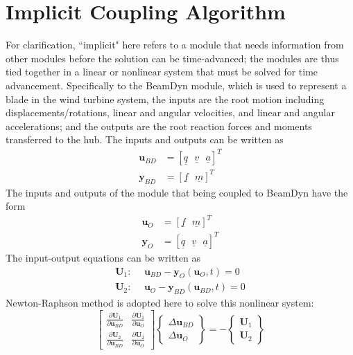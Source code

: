 \documentclass{aiaa-tc}
\renewcommand{\vec}[1]{\underline{#1}}
\begin{document}
\section{Implicit Coupling Algorithm}
For clarification, ``implicit" here refers to a module that needs information from other modules before the solution can be time-advanced; the modules are thus tied together in a linear or nonlinear system that must be solved for time advancement. Specifically to the BeamDyn module, which is used to represent a blade in the wind turbine system, the inputs are the root motion including displacements/rotations, linear and angular velocities, and linear and angular accelerations; and the outputs are the root reaction forces and moments transferred to the hub. The inputs and outputs can be written as
\begin{align}
    \label{BDInput}
    \mathbf{u}_{BD} &= \left[ \vec{q}~~~\vec{v}~~~\vec{a}\right]^T \\
    \label{BDOutput}
    \mathbf{y}_{BD} &= \left[ \vec{f}~~~\vec{m} \right]^T
\end{align}
The inputs and outputs of the module that being coupled to BeamDyn have the form
\begin{align}
    \label{OtherInput}
    \mathbf{u}_{O} &= \left[ \vec{f}~~~\vec{m} \right]^T\\
    \label{OtherOutput}
    \mathbf{y}_{O} &= \left[ \vec{q}~~~\vec{v}~~~\vec{a}\right]^T 
\end{align}
The input-output equations can be written as
\begin{align}
    \label{IOEq1}
    \mathbf{U}_1: ~~&\mathbf{u}_{BD} - \mathbf{y}_{O} (\mathbf{u}_O,t)= 0 \\
    \label{IOEq2}
     \mathbf{U}_2: ~~&\mathbf{u}_{O} - \mathbf{y}_{BD}(\mathbf{u}_{BD},t) = 0
\end{align}
Newton-Raphson method is adopted here to solve this nonlinear system: 
\begin{equation}
    \label{NREq}
    \begin{bmatrix}
    \frac{\partial \mathbf{U}_1}{\partial \mathbf{u}_{BD}}  &  \frac{\partial \mathbf{U}_{1}}{\partial \mathbf{u}_{O}} \\
    \frac{\partial \mathbf{U}_2}{\partial \mathbf{u}_{BD}}  &  \frac{\partial \mathbf{U}_{2}}{\partial \mathbf{u}_{O}} 
    \end{bmatrix}
    \begin{Bmatrix}
     \Delta \mathbf{u}_{BD} \\
     \Delta \mathbf{u}_{O}
    \end{Bmatrix} 
    =
    -
    \begin{Bmatrix}
     \mathbf{U}_1 \\
     \mathbf{U}_2
    \end{Bmatrix}
\end{equation}
\end{document}
